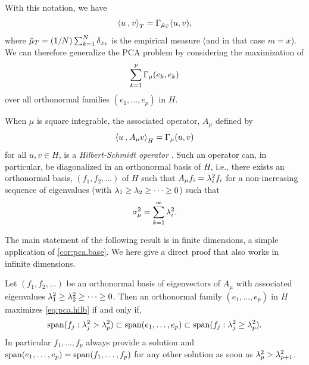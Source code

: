 With this notation, we have
\[
{\langle {u}\mathbin{,} {v}\rangle}_T = \Gamma_{\hat\mu_T}(u,v),
\]
where $\hat\mu_T = (1/N) \sum_{k=1}^N \delta_{x_k}$ is the empirical measure (and in that case $m = \bar x$). We can therefore generalize the PCA problem by considering the  maximization of 
\begin{equation}
\label{eq:pca.hilb}
\sum_{k=1}^p \Gamma_\mu(e_k, e_k)
\end{equation}
over all orthonormal families $(e_1, \ldots, e_p)$ in $H$.

When $\mu$ is square integrable, the associated operator, $A_\mu$ defined by 
\begin{equation}
\label{eq:cov.operator}
{\langle {u}\mathbin{,} {A_\mu v}\rangle}_H = \Gamma_\mu(u,v)
\end{equation} 
for all $u,v\in H$, is a {\em Hilbert-Schmidt operator} \citep{yos70}. Such an operator can, in particular, be diagonalized in an orthonormal basis of $H$, i.e., there exists an orthonormal
basis, $(f_1, f_2, \ldots)$ of $H$ such that $A_\mu f_i = \lambda^2_i f_i$ for a non-increasing sequence of eigenvalues (with $\lambda_1\geq \lambda_2 \geq \cdots \geq 0$) such that
\[
\sigma_\mu^2 = \sum_{k=1}^\infty \lambda^2_i.
\]

%
%

The main statement of the following result is in finite dimensions, a simple application of \cref{cor:pca.base}. We here give a direct proof that also works in infinite dimensions.
 \begin{theorem}
\label{th:rayleigh}
Let $(f_1, f_2, \ldots)$ be an orthonormal basis of eigenvectors of  $A_\mu$ with associated eigenvalues $\lambda_1^2\geq \lambda_2^2 \geq \cdots \geq 0$.
Then an orthonormal family $(e_1, \ldots, e_p)$ in $H$ maximizes \cref{eq:pca.hilb} if and only if,
\begin{equation}
\label{eq:rayleigh}
\mathrm{span}(f_j: \lambda^2_j>\lambda^2_p) \subset \mathrm{span}(e_1, \ldots,
e_p) \subset \mathrm{span}(f_j: \lambda^2_j \geq \lambda^2_p).
\end{equation}
In particular $f_1, \ldots, f_p$ always provide a solution and $\mathrm{span}(e_1, \ldots, e_p) = \mathrm{span}(f_1, \ldots, f_p)$ for any other solution as soon as $\lambda^2_p > \lambda^2_{p+1}$. 
\end{theorem}

